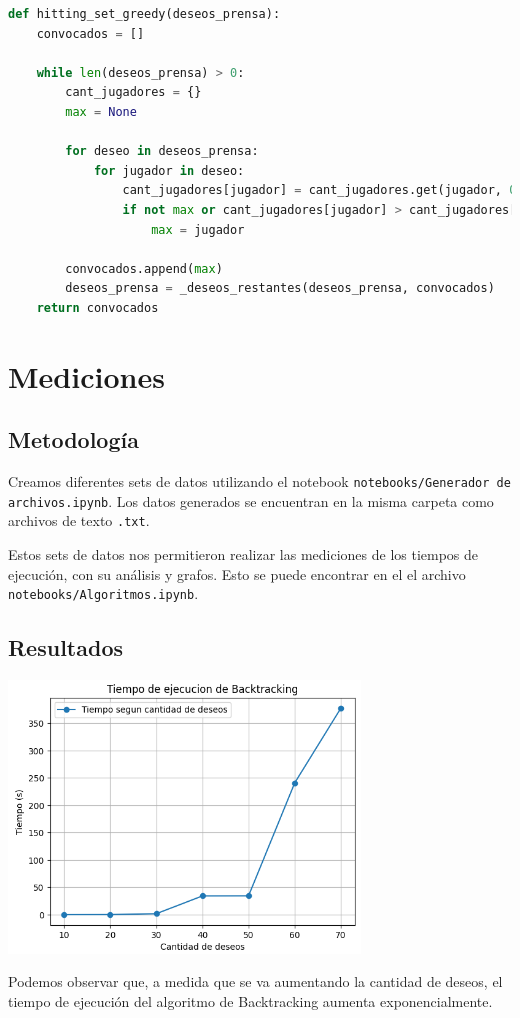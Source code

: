 \documentclass{estilo}
\begin{document}
\begin{lstlisting}[language=Python]
def hitting_set_greedy(deseos_prensa):
    convocados = []

    while len(deseos_prensa) > 0:
        cant_jugadores = {}
        max = None
        
        for deseo in deseos_prensa:
            for jugador in deseo:
                cant_jugadores[jugador] = cant_jugadores.get(jugador, 0) + 1
                if not max or cant_jugadores[jugador] > cant_jugadores[max]:
                    max = jugador
                    
        convocados.append(max)
        deseos_prensa = _deseos_restantes(deseos_prensa, convocados)
    return convocados
\end{lstlisting}

\newpage

\section{Mediciones}
\subsection{Metodología}

Creamos diferentes sets de datos utilizando el notebook \texttt{notebooks/Generador de archivos.ipynb}. Los datos generados se encuentran en la misma carpeta como archivos de texto \texttt{.txt}.

Estos sets de datos nos permitieron realizar las mediciones de los tiempos de ejecución, con su análisis y grafos. Esto se puede encontrar en el el archivo \texttt{notebooks/Algoritmos.ipynb}.

\subsection{Resultados}

\begin{center}
\includegraphics[width=0.7\textwidth]{img/tiempo_backtracking.png}

Podemos observar que, a medida que se va aumentando la cantidad de deseos, el tiempo de ejecución del algoritmo de Backtracking aumenta exponencialmente.
\end{center}
\end{document}
